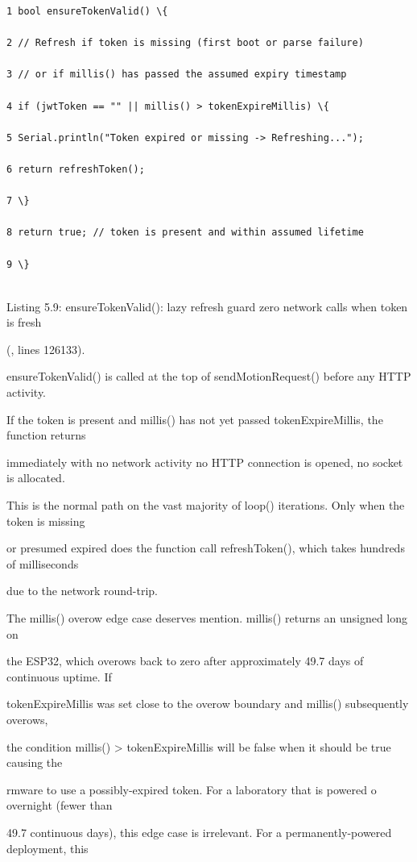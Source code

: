 \begin{listingbox}
	\begin{verbatim}
1 bool ensureTokenValid() \{

2 // Refresh if token is missing (first boot or parse failure)

3 // or if millis() has passed the assumed expiry timestamp

4 if (jwtToken == "" || millis() > tokenExpireMillis) \{

5 Serial.println("Token expired or missing -> Refreshing...");

6 return refreshToken();

7 \}

8 return true; // token is present and within assumed lifetime

9 \}


\end{verbatim}
\end{listingbox}
Listing 5.9: ensureTokenValid(): lazy refresh guard  zero network calls when token is fresh

(, lines 126133).

ensureTokenValid() is called at the top of sendMotionRequest() before any HTTP activity.

If the token is present and millis() has not yet passed tokenExpireMillis, the function returns

immediately with no network activity  no HTTP connection is opened, no socket is allocated.

This is the normal path on the vast majority of loop() iterations. Only when the token is missing

or presumed expired does the function call refreshToken(), which takes hundreds of milliseconds

due to the network round-trip.

The millis() overow edge case deserves mention. millis() returns an unsigned long on

the ESP32, which overows back to zero after approximately 49.7 days of continuous uptime. If

tokenExpireMillis was set close to the overow boundary and millis() subsequently overows,

the condition millis() > tokenExpireMillis will be false when it should be true  causing the

rmware to use a possibly-expired token. For a laboratory that is powered o overnight (fewer than

49.7 continuous days), this edge case is irrelevant. For a permanently-powered deployment, this

